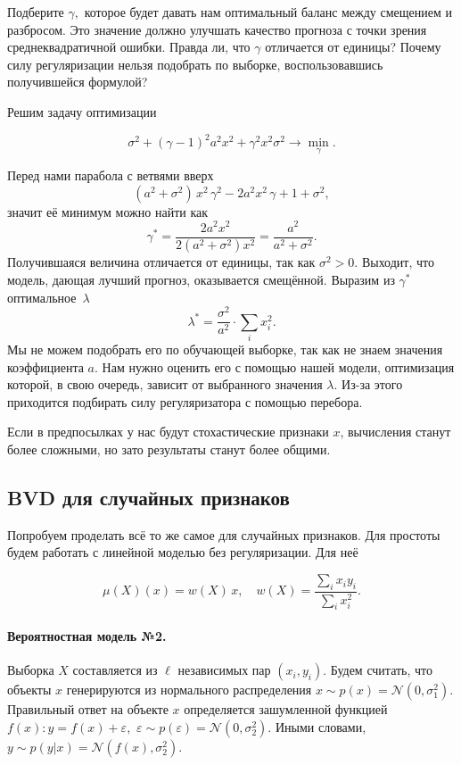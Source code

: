 \documentclass[12pt,fleqn]{article}
\begin{document}
\begin{vkProblem}
    Подберите $\gamma,$ которое будет давать нам оптимальный баланс между смещением и разбросом.
    Это значение должно улучшать качество прогноза с точки зрения среднеквадратичной ошибки.
    Правда ли, что $\gamma$ отличается от единицы?
    Почему силу регуляризации нельзя подобрать по выборке, воспользовавшись получившейся формулой?
\end{vkProblem}
\begin{esSolution}
    Решим задачу оптимизации 
    
    $$
    \sigma^2 + (\gamma - 1)^2 a^2 x^2 + \gamma^2 x^2 \sigma^2 \to \min_{\gamma}.
    $$
    
    \noindent Перед нами парабола с ветвями вверх
    $$
    (a^2 + \sigma^2) \, x^2 \, \gamma^2 - 2a^2x^2 \, \gamma + 1 + \sigma^2,
    $$
    значит её минимум можно найти как
    $$
    \gamma^{*} = \dfrac{2a^2x^2}{2(a^2 + \sigma^2)x^2} = \dfrac{a^2}{a^2 + \sigma^2}. 
    $$
    Получившаяся величина отличается от единицы, так как $\sigma^2 > 0.$
    Выходит, что модель, дающая лучший прогноз, оказывается смещённой.
    Выразим из $\gamma^{*}$ оптимальное~$\lambda$
    $$
    \lambda^{*} = \dfrac{\sigma^2}{a^2} \cdot \sum_i x_i^2.
    $$
    Мы не можем подобрать его по обучающей выборке, так как не знаем значения коэффициента $a$.
    Нам нужно оценить его с помощью нашей модели, оптимизация которой, в свою очередь, зависит от выбранного значения $\lambda.$
    Из-за этого приходится подбирать силу регуляризатора с помощью перебора.
\end{esSolution}

Если в предпосылках у нас будут стохастические признаки $x$, вычисления станут более сложными, но зато результаты станут более общими. 

\subsection{BVD для случайных признаков}

Попробуем проделать всё то же самое для случайных признаков.
Для простоты будем работать с линейной моделью без регуляризации.
Для неё

$$
\mu(X)(x) = w(X) \,x, \quad w(X) = \dfrac{\sum_i x_i y_i}{\sum_i x_i^2}.
$$

\paragraph{Вероятностная модель №2.}
Выборка $X$ составляется из $\ell$ независимых пар $(x_i, y_i)$.
Будем считать, что объекты $x$ генерируются из нормального распределения $x \sim p(x) = \mathcal{N}(0, \sigma_1^2)$.
Правильный ответ на объекте $x$ определяется зашумленной функцией $f(x): y = f(x) + \varepsilon$,~$\varepsilon \sim p(\varepsilon) = \mathcal{N}(0, \sigma_2^2)$.
Иными словами, $y \sim p(y|x) = \mathcal{N}(f(x), \sigma_2^2)$.
\end{document}
